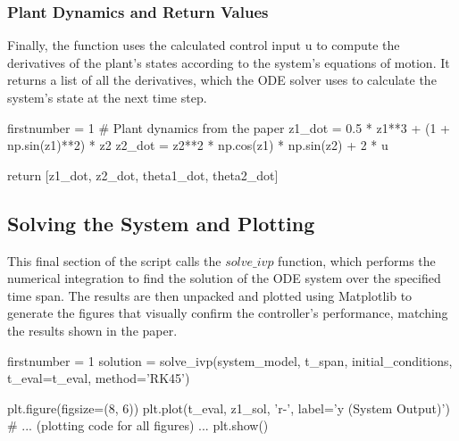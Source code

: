 \subsubsection{Plant Dynamics and Return Values}
Finally, the function uses the calculated control input u to compute the derivatives of the plant's states according to the system's equations of motion. It returns a list of all the derivatives, which the ODE solver uses to calculate the system's state at the next time step.
\begin{code}
	\begin{matlabcode}{firstnumber = 1}
# Plant dynamics from the paper
z1_dot = 0.5 * z1**3 + (1 + np.sin(z1)**2) * z2
z2_dot = z2**2 * np.cos(z1) * np.sin(z2) + 2 * u

return [z1_dot, z2_dot, theta1_dot, theta2_dot]
	\end{matlabcode}
	\label{code:p36}
\end{code}

\subsection{Solving the System and Plotting}
This final section of the script calls the $solve\_ivp$ function, which performs the numerical integration to find the solution of the ODE system over the specified time span. The results are then unpacked and plotted using Matplotlib to generate the figures that visually confirm the controller's performance, matching the results shown in the paper.
\begin{code}
	\begin{matlabcode}{firstnumber = 1}
solution = solve_ivp(system_model, t_span, initial_conditions, t_eval=t_eval, method='RK45')

plt.figure(figsize=(8, 6))
plt.plot(t_eval, z1_sol, 'r-', label='y (System Output)')
# ... (plotting code for all figures) ...
plt.show()
	\end{matlabcode}
	\label{code:p37}
\end{code}